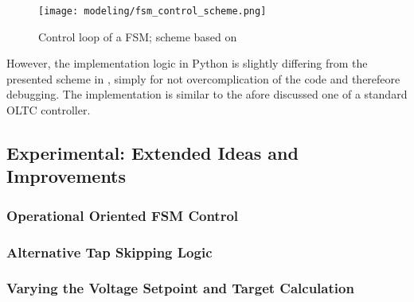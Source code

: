 \begin{figure}[htb!]
        \centering
        \texttt{[image: modeling/fsm\_control\_scheme.png]}
        \caption[Control loop of a \acf{FSM}]{Control loop of a \acs{FSM}; scheme based on \textcite{burlakin_2024}}
        \label{fig:fsm-control-loop}
\end{figure}

However, the implementation logic in Python is slightly differing from the presented scheme in \autocite{burlakin_2024}, simply for not overcomplication of the code and therefeore debugging. 
The implementation is similar to the afore discussed one of a standard \acs{OLTC} controller. 


\subsection{Experimental: Extended Ideas and Improvements}

\subsubsection{Operational Oriented FSM Control}

\subsubsection{Alternative Tap Skipping Logic}

\subsubsection{Varying the Voltage Setpoint and Target Calculation}




